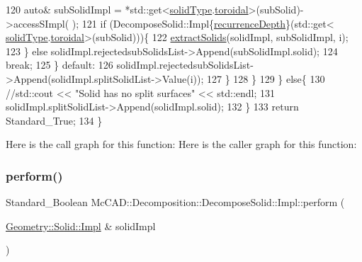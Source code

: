 \begin{DoxyCode}
120                 \textcolor{keyword}{auto}& subSolidImpl = *std::get<\hyperlink{classMcCAD_1_1Decomposition_1_1DecomposeSolid_1_1Impl_ad808642e410eb4b8fa0d42b9a8ca3715}{solidType}.\hyperlink{classMcCAD_1_1Tools_1_1SolidType_a69c62abbe9fa709ccbaf47d4daf356e1ad9493def4181ec95fec305f92c8ba5f0}{toroidal}>(subSolid)->accessSImpl(
      );
121                 \textcolor{keywordflow}{if} (DecomposeSolid::Impl\{\hyperlink{classMcCAD_1_1Decomposition_1_1DecomposeSolid_1_1Impl_ad908b2687b52f636d8368b814aa5f770}{recurrenceDepth}\}(std::get<
      \hyperlink{classMcCAD_1_1Decomposition_1_1DecomposeSolid_1_1Impl_ad808642e410eb4b8fa0d42b9a8ca3715}{solidType}.\hyperlink{classMcCAD_1_1Tools_1_1SolidType_a69c62abbe9fa709ccbaf47d4daf356e1ad9493def4181ec95fec305f92c8ba5f0}{toroidal}>(subSolid)))\{
122                     \hyperlink{classMcCAD_1_1Decomposition_1_1DecomposeSolid_1_1Impl_a80861ddb3269bb59b3f2333201836e43}{extractSolids}(solidImpl, subSolidImpl, i);
123                 \} \textcolor{keywordflow}{else} solidImpl.rejectedsubSolidsList->Append(subSolidImpl.solid);
124                 \textcolor{keywordflow}{break};
125             \} \textcolor{keywordflow}{default}:
126                 solidImpl.rejectedsubSolidsList->Append(solidImpl.splitSolidList->Value(i));
127             \}
128         \}
129     \} \textcolor{keywordflow}{else}\{
130         \textcolor{comment}{//std::cout << "Solid has no split surfaces" << std::endl;}
131         solidImpl.splitSolidList->Append(solidImpl.solid);
132     \}
133     \textcolor{keywordflow}{return} Standard\_True;
134 \}
\end{DoxyCode}
Here is the call graph for this function\+:
Here is the caller graph for this function\+:
\mbox{\label{classMcCAD_1_1Decomposition_1_1DecomposeSolid_1_1Impl_aa65d0c829adf71764f3d1954cd8d6829}} 
\subsubsection{\texorpdfstring{perform()}{perform()}\hspace{0.1cm}{\footnotesize\ttfamily [2/2]}}
{\footnotesize\ttfamily Standard\+\_\+\+Boolean Mc\+C\+A\+D\+::\+Decomposition\+::\+Decompose\+Solid\+::\+Impl\+::perform (\begin{DoxyParamCaption}\item[{\hyperlink{classMcCAD_1_1Geometry_1_1Solid_1_1Impl}{Geometry\+::\+Solid\+::\+Impl} \&}]{solid\+Impl }\end{DoxyParamCaption})}

